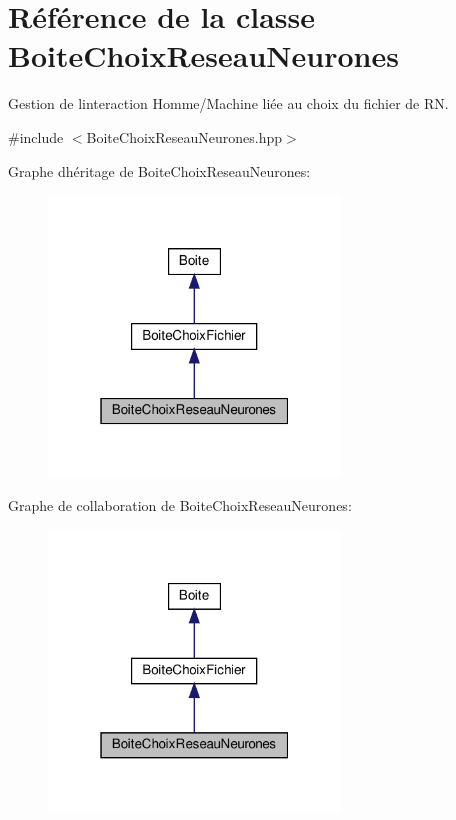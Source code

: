 \hypertarget{classBoiteChoixReseauNeurones}{}\section{Référence de la classe Boite\+Choix\+Reseau\+Neurones}
\label{classBoiteChoixReseauNeurones}


Gestion de l\textquotesingle{}interaction Homme/\+Machine liée au choix du fichier de RN.  




{\ttfamily \#include $<$Boite\+Choix\+Reseau\+Neurones.\+hpp$>$}



Graphe d\textquotesingle{}héritage de Boite\+Choix\+Reseau\+Neurones\+:
\nopagebreak
\begin{figure}[H]
\begin{center}
\leavevmode
\includegraphics[width=220pt]{classBoiteChoixReseauNeurones__inherit__graph}
\end{center}
\end{figure}


Graphe de collaboration de Boite\+Choix\+Reseau\+Neurones\+:
\nopagebreak
\begin{figure}[H]
\begin{center}
\leavevmode
\includegraphics[width=220pt]{classBoiteChoixReseauNeurones__coll__graph}
\end{center}
\end{figure}
